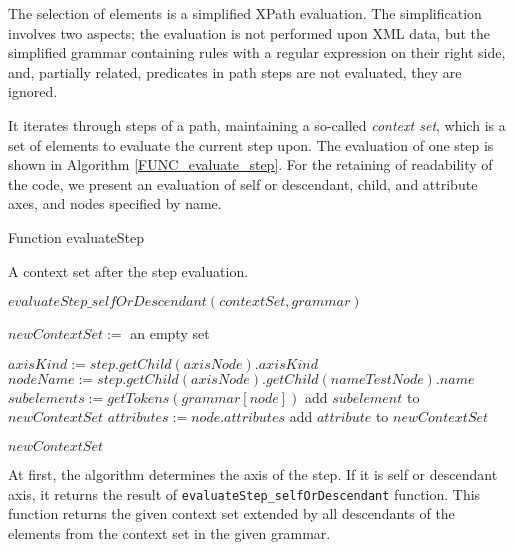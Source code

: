 The selection of elements is a simplified XPath evaluation. The simplification involves two aspects; the evaluation is not performed upon XML data, but the simplified grammar containing rules with a regular expression on their right side, and, partially related, predicates in path steps are not evaluated, they are ignored.

It iterates through steps of a path, maintaining a so-called \emph{context set}, which is a set of elements to evaluate the current step upon. The evaluation of one step is shown in Algorithm \ref{FUNC_evaluate_step}. For the retaining of readability of the code, we present an evaluation of self or descendant, child, and attribute axes, and nodes specified by name.

\begin{algorithm}
\caption{Function evaluateStep}
\label{FUNC_evaluate_step}
\begin{algorithmic}[1]

\ENSURE A context set after the step evaluation.

	\RETURN $evaluateStep\_selfOrDescendant(contextSet, grammar)$
\ENDIF

\STATE $newContextSet :=$ an empty set

\STATE $axisKind := step.getChild(axisNode).axisKind$
\STATE $nodeName := step.getChild(axisNode).getChild(nameTestNode).name$
			\STATE $subelements := getTokens(grammar[node])$
					\STATE add $subelement$ to $newContextSet$
				\ENDIF
			\ENDFOR
		\ENDIF
	\ENDFOR
{}
			\STATE $attributes := node.attributes$
					\STATE add $attribute$ to $newContextSet$
				\ENDIF
			\ENDFOR
		\ENDIF
	\ENDFOR
\ENDIF

\RETURN $newContextSet$
\end{algorithmic}
\end{algorithm}

At first, the algorithm determines the axis of the step. If it is self or descendant axis, it returns the result of \texttt{evaluateStep\_selfOrDescendant} function. This function returns the given context set extended by all descendants of the elements from the context set in the given grammar.

